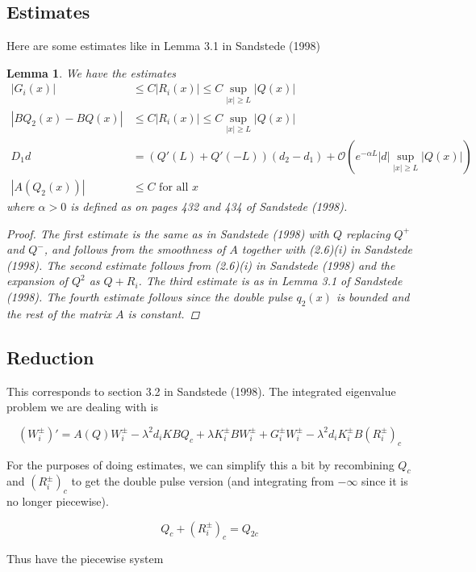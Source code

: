 \documentclass[12pt]{article}
\newtheorem{lemma}{Lemma}
\begin{document}
\subsection*{Estimates}
Here are some estimates like in Lemma 3.1 in Sandstede (1998)

\begin{lemma}We have the estimates
\begin{align*}
|G_i(x)| &\leq C|R_i(x)| \leq C \sup_{|x| \geq L} |Q(x)| \\
| B Q_2(x) - B Q(x) | & \leq C |R_i(x)| \leq C \sup_{|x| \geq L} |Q(x)| \\
D_1 d &= (Q'(L) + Q'(-L))(d_2 - d_1) +\mathcal{O}\left( e^{-\alpha L} |d| \sup_{|x| \geq L} |Q(x)| \right)\\
|A(Q_2(x))| &\leq C \textrm{ for all }x
\end{align*}
where $\alpha > 0$ is defined as on pages 432 and 434 of Sandstede (1998).
\begin{proof}
The first estimate is the same as in Sandstede (1998) with $Q$ replacing $Q^+$ and $Q^-$, and follows from the smoothness of $A$ together with (2.6)(i) in Sandstede (1998). The second estimate follows from (2.6)(i) in Sandstede (1998) and the expansion of $Q^2$ as $Q + R_i$. The third estimate is as in Lemma 3.1 of Sandstede (1998). The fourth estimate follows since the double pulse $q_2(x)$ is bounded and the rest of the matrix $A$ is constant.
\end{proof}
\end{lemma}

\subsection*{Reduction}
This corresponds to section 3.2 in Sandstede (1998). The integrated eigenvalue problem we are dealing with is

\begin{equation}\label{inteigQ}
(W_i^\pm)' = A(Q)W_i^\pm - \lambda^2 d_i KBQ_{c} + \lambda K_i^\pm BW_i^\pm + G_i^\pm W_i^\pm - \lambda^2 d_i K_i^\pm B (R_i^\pm)_c
\end{equation}

For the purposes of doing estimates, we can simplify this a bit by recombining $Q_c$ and $(R_i^\pm)_c$ to get the double pulse version (and integrating from $-\infty$ since it is no longer piecewise).

\[
Q_c + (R_i^\pm)_c = Q_{2c}
\]

Thus have the piecewise system
\end{document}
